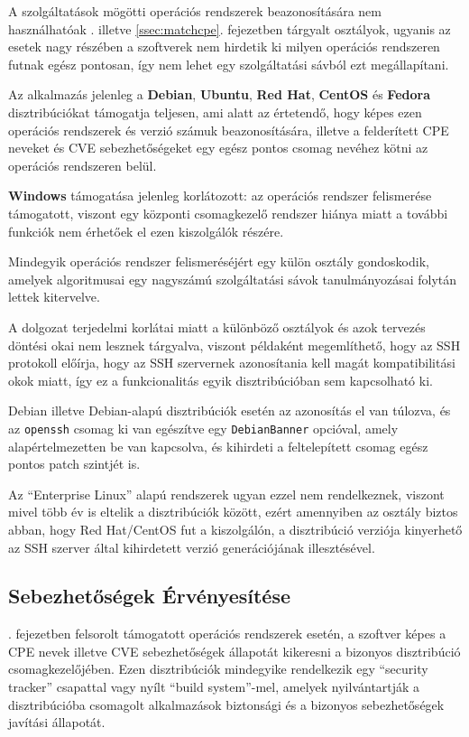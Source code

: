 \documentclass[a4paper,12pt]{article}
\begin{document}
	A szolgáltatások mögötti operációs rendszerek beazonosítására nem használhatóak \az{\ref{ssec:patternmatch}}. illetve \ref{ssec:matchcpe}. fejezetben tárgyalt osztályok, ugyanis az esetek nagy részében a szoftverek nem hirdetik ki milyen operációs rendszeren futnak egész pontosan, így nem lehet egy szolgáltatási sávból ezt megállapítani.
	
	Az alkalmazás jelenleg a \textbf{Debian}, \textbf{Ubuntu}, \textbf{Red Hat}, \textbf{CentOS} és \textbf{Fedora} disztribúciókat támogatja teljesen, ami alatt az értetendő, hogy képes ezen operációs rendszerek és verzió számuk beazonosítására, illetve a felderített CPE neveket és CVE sebezhetőségeket egy egész pontos csomag nevéhez kötni az operációs rendszeren belül.
	
	\textbf{Windows} támogatása jelenleg korlátozott: az operációs rendszer felismerése támogatott, viszont egy központi csomagkezelő rendszer hiánya miatt a további funkciók nem érhetőek el ezen kiszolgálók részére.
	
	Mindegyik operációs rendszer felismeréséjért egy külön osztály gondoskodik, amelyek algoritmusai egy nagyszámú szolgáltatási sávok tanulmányozásai folytán lettek kitervelve.
	
	A dolgozat terjedelmi korlátai miatt a különböző osztályok és azok tervezés döntési okai nem lesznek tárgyalva, viszont példaként megemlíthető, hogy az SSH protokoll előírja, hogy az SSH szervernek azonosítania kell magát kompatibilitási okok miatt, így ez a funkcionalitás egyik disztribúcióban sem kapcsolható ki.
	
	Debian illetve Debian-alapú disztribúciók esetén az azonosítás el van túlozva, és az \texttt{openssh} csomag ki van egészítve egy \texttt{DebianBanner} opcióval, amely alapértelmezetten be van kapcsolva, és kihirdeti a feltelepített csomag egész pontos patch szintjét is.
	
	Az ``Enterprise Linux'' alapú rendszerek ugyan ezzel nem rendelkeznek, viszont mivel több év is eltelik a disztribúciók között, ezért amennyiben az osztály biztos abban, hogy Red Hat/CentOS fut a kiszolgálón, a disztribúció verziója kinyerhető az SSH szerver által kihirdetett verzió generációjának illesztésével.

\subsection{Sebezhetőségek Érvényesítése}

	\Az{\ref{ssec:opsysmatcher}}. fejezetben felsorolt támogatott operációs rendszerek esetén, a szoftver képes a CPE nevek illetve CVE sebezhetőségek állapotát kikeresni a bizonyos disztribúció csomagkezelőjében. Ezen disztribúciók mindegyike rendelkezik egy ``security tracker'' csapattal vagy nyílt ``build system''-mel, amelyek nyilvántartják a disztribúcióba csomagolt alkalmazások biztonsági és a bizonyos sebezhetőségek javítási állapotát.
	
\end{document}

